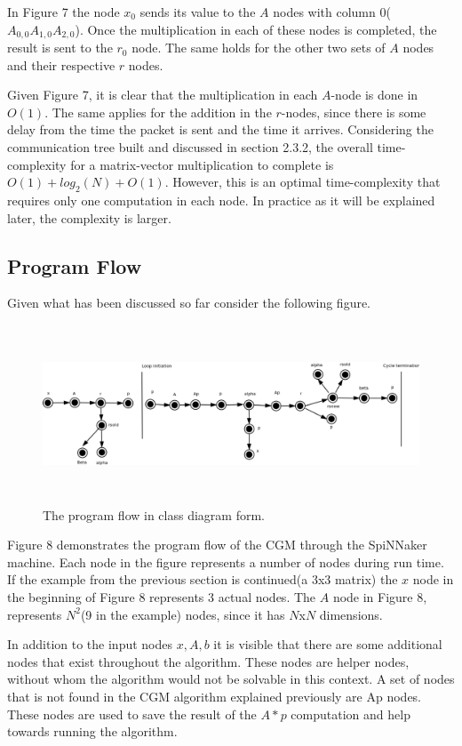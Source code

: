 \documentclass[12pt,twosided]{article}
\begin{document}
In Figure 7 the node $x_0$ sends its value to the $A$ nodes with column 0($A_{0,0} A_{1,0} A_{2,0}$). Once the multiplication in each of these nodes is completed, the result is sent to the $r_0$ node. The same holds for the other two sets of $A$ nodes and their respective $r$ nodes. 

Given Figure 7, it is clear that the multiplication in each $A$-node is done in $O(1)$. The same applies for the addition in the $r$-nodes, since there is some delay from the time the packet is sent and the time it arrives. Considering the communication tree built and discussed in section 2.3.2, the overall time-complexity for a matrix-vector multiplication to complete is $O(1)+log_2(N)+O(1)$. However, this is an optimal time-complexity that requires only one computation in each node. In practice as it will be explained later, the complexity is larger.
\subsection{Program Flow}
Given what has been discussed so far consider the following figure.
\begin{figure}[h!]
\includegraphics[width=500pt,height=150pt,scale=1]{Pics/program_flow.png}
\centering
\caption{The program flow in class diagram form.}
\end{figure}
Figure 8 demonstrates the program flow of the CGM through the SpiNNaker machine. Each node in the figure represents a number of nodes during run time. If the example from the previous section is continued(a 3x3 matrix) the $x$ node in the beginning of Figure 8 represents 3 actual nodes. The $A$ node in Figure 8, represents $N^2$(9 in the example) nodes, since it has $N$x$N$ dimensions.

In addition to the input nodes $x,A,b$ it is visible that there are some additional nodes that exist throughout the algorithm. These nodes are helper nodes, without whom the algorithm would not be solvable in this context. A set of nodes that is not found in the CGM algorithm explained previously are Ap nodes. These nodes are used to save the result of the $A*p$ computation and help towards running the algorithm.
\end{document}
